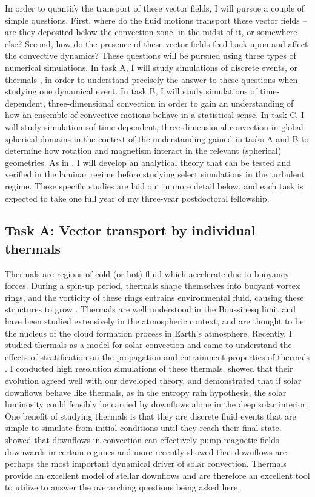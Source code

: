 \documentclass[aasms,12pt]{article}
\begin{document}
In order to quantify the transport of these vector fields, I will pursue a couple of simple questions.
First, where do the fluid motions transport these vector fields -- are they deposited below the convection zone, in the midst of it, or somewhere else?
Second, how do the presence of these vector fields feed back upon and affect the convective dynamics?
These questions will be pursued using three types of numerical simulations.
In task A, I will study simulations of discrete events, or thermals \citep[as in ][]{andersLB2019}, in order to understand precisely the answer to these questions when studying one dynamical event.
In task B, I will study simulations of time-dependent, three-dimensional convection \citep[as in ][]{anders&brown2017} in order to gain an understanding of how an ensemble of convective motions behave in a statistical sense.
In task C, I will study simulation sof time-dependent, three-dimensional convection in global spherical domains in the context of the understanding gained in tasks A and B to determine how rotation and magnetism interact in the relevant (spherical) geometries.
As in \citet{andersLB2019}, I will develop an analytical theory that can be tested and verified in the laminar regime before studying select simulations in the turbulent regime.
These specific studies are laid out in more detail below, and each task is expected to take one full year of my three-year postdoctoral fellowship.


\subsection{Task A: Vector transport by individual thermals}
Thermals are regions of cold (or hot) fluid which accelerate due to buoyancy forces.
During a spin-up period, thermals shape themselves into buoyant vortex rings, and the vorticity of these rings entrains environmental fluid, causing these structures to grow \citep{lecoanet&jeevanjee2019}.
Thermals are well understood in the Boussinesq limit and have been studied extensively in the atmospheric context, and are thought to be the nucleus of the cloud formation process in Earth's atmosphere.
Recently, I studied thermals as a model for solar convection and came to understand the effects of stratification on the propagation and entrainment properties of thermals \citep{andersLB2019}.
I conducted high resolution simulations of these thermals, showed that their evolution agreed well with our developed theory, and demonstrated that if solar downflows behave like thermals, as in the entropy rain hypothesis, the solar luminosity could feasibly be carried by downflows alone in the deep solar interior.
One benefit of studying thermals is that they are discrete fluid events that are simple to simulate from initial conditions until they reach their final state.
\citet{tobias&all1998} showed that downflows in convection can effectively pump magnetic fields downwards in certain regimes and more recently \citet{kapyla&all2017} showed that downflows are perhaps the most important dynamical driver of solar convection.
Thermals provide an excellent model of stellar downflows and are therefore an excellent tool to utilize to answer the overarching questions being asked here.
\end{document}
